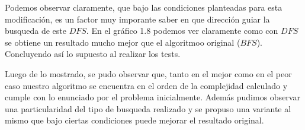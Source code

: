 Podemos observar claramente, que bajo las condiciones planteadas para esta modificación, es un factor muy imporante saber en que dirección guiar la busqueda de este $DFS$. En el gráfico 1.8 podemos ver claramente como con $DFS$ se obtiene un resultado mucho mejor que el algoritmoo original ($BFS$). Concluyendo así lo supuesto al realizar los tests.

Luego de lo mostrado, se pudo observar que, tanto en el mejor como en el peor caso nuestro algoritmo se encuentra en el orden de la complejidad calculado y cumple con lo enunciado por el problema inicialmente. Además pudimos observar una particularidad del tipo de busqueda realizado y se propuso una variante al mismo que bajo ciertas condiciones puede mejorar el resultado original.
